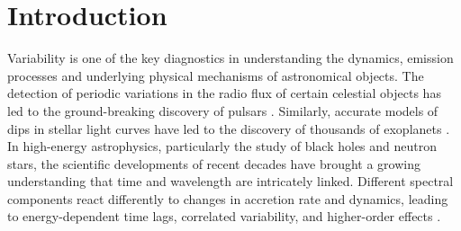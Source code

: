 \documentclass[twocolumn]{aastex62}
\begin{document}


\section{Introduction} \label{sec:intro}

Variability is one of the key diagnostics in understanding the dynamics, emission processes and underlying physical mechanisms of astronomical objects. 
The detection of periodic variations in the radio flux of certain celestial objects has led to the ground-breaking discovery of pulsars \citep{hewish1968}. 
Similarly, accurate models of dips in stellar light curves have led to the discovery of thousands of exoplanets \citep[e.g.,][]{charbonneau2000,henry2000,coughlin2016}. 
In high-energy astrophysics, particularly the study of black holes and neutron stars, the scientific developments of recent decades have brought a growing understanding that time and wavelength are intricately linked. 
Different spectral components react differently to changes in accretion rate and dynamics, leading to energy-dependent time lags, correlated variability, and higher-order effects \citep[for a review, see][]{uttley2014}. 
\end{document}
